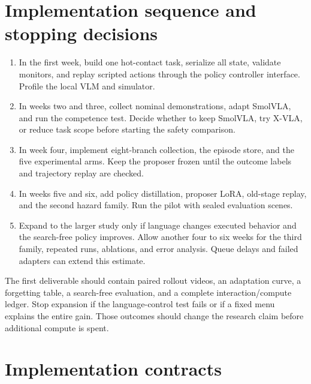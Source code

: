 \documentclass[11pt]{article}
\begin{document}
\section{Implementation sequence and stopping decisions}

\begin{enumerate}
\item In the first week, build one hot-contact task, serialize all state, validate monitors, and replay scripted actions through the policy controller interface. Profile the local VLM and simulator.
\item In weeks two and three, collect nominal demonstrations, adapt SmolVLA, and run the competence test. Decide whether to keep SmolVLA, try X-VLA, or reduce task scope before starting the safety comparison.
\item In week four, implement eight-branch collection, the episode store, and the five experimental arms. Keep the proposer frozen until the outcome labels and trajectory replay are checked.
\item In weeks five and six, add policy distillation, proposer LoRA, old-stage replay, and the second hazard family. Run the pilot with sealed evaluation scenes.
\item Expand to the larger study only if language changes executed behavior and the search-free policy improves. Allow another four to six weeks for the third family, repeated runs, ablations, and error analysis. Queue delays and failed adapters can extend this estimate.
\end{enumerate}

The first deliverable should contain paired rollout videos, an adaptation curve, a forgetting table, a search-free evaluation, and a complete interaction/compute ledger. Stop expansion if the language-control test fails or if a fixed menu explains the entire gain. Those outcomes should change the research claim before additional compute is spent.

\appendix
\section{Implementation contracts}
\end{document}
